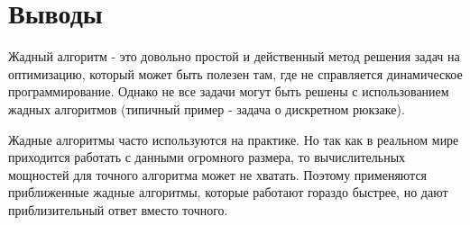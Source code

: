 \section{Выводы}

Жадный алгоритм - это довольно простой и действенный метод решения задач на оптимизацию, который может быть полезен там, где не справляется динамическое программирование. Однако не все задачи могут быть решены с использованием жадных алгоритмов (типичный пример - задача о дискретном рюкзаке).

Жадные алгоритмы часто используются на практике. Но так как в реальном мире приходится работать с данными огромного размера, то вычислительных мощностей для точного алгоритма может не хватать. Поэтому применяются приближенные жадные алгоритмы, которые работают гораздо быстрее, но дают приблизительный ответ вместо точного.
\pagebreak
